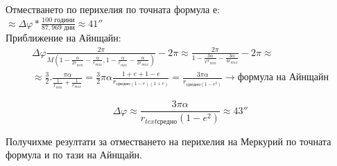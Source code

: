 \documentclass[a4paper,12pt]{article}
\begin{document}
    Отместването по перихелия по точната формула е: \\ 
    $\approx \varDelta\varphi * \frac{100\text{ години}}{87, 969 \text{ дни}} \approx 41''$ \\

    Приближение на Айнщайн:
    \begin{equation*}
        \begin{aligned}
            \varDelta\varphi \frac{2\pi}{M\left( 1-\frac{\alpha}{2r_{min}} - \frac{\alpha}{r_{max}}, 1-\frac{\alpha}{r_{min}} - \frac{\alpha}{2r_{max}} \right)} - 2\pi \approx 
            \frac{2\pi}{1 - \frac{3\alpha}{\varphi r_{min}} - \frac{3\alpha}{4r_{max}}} - 2\pi \approx \\
            \approx \frac{3}{2}.\frac{\pi\alpha}{\frac{1}{r_{min}} + \frac{1}{r_{max}}} = \frac{3}{2}\pi\alpha \frac{1+e+1-e}{r_{\text{средно}(1-e)(1+e)}} = \frac{3\pi\alpha}{r_{\text{средно}(1-e^2)}} \rightarrow \text{формула на Айнщайн}
        \end{aligned}
    \end{equation*}

    \begin{equation*}
        \varDelta\varphi \approx \frac{3\pi\alpha}{r_{text{средно}}(1-e^2)} \approx 43''
    \end{equation*}

    Получихме резултати за отместването на перихелия на Меркурий по точната формула и по тази на Айнщайн.
\end{document}
